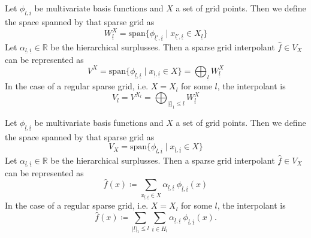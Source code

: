 \documentclass[
  a4paper,  %
  twoside,  %
  bibliography=totoc,
  headsepline,
  cleardoublepage=empty,
  parskip=half,
  draft=false
]{scrbook}
\begin{document}
\begin{definition}
Let $\phi_{\underline{l},\underline{i}}$ be multivariate basis functions and $X$ a set of grid points.
Then we define the space spanned by that sparse grid as
\begin{equation}
W_{\underline{l}}^X=\text{span} \{\phi_{\underline{l'},\underline{i}} \mid x_{\underline{l'},\underline{i}} \in X_{\underline{l}}\}
\end{equation}
Let $\alpha_{\underline{l},\underline{i}} \in \mathds{R}$ be the hierarchical surplusses.
Then a sparse grid interpolant $\hat{f} \in V_X$ can be represented as
\begin{equation}
V^X=\text{span} \{\phi_{\underline{l},\underline{i}} \mid x_{\underline{l},\underline{i}} \in X\}=\bigoplus_{\underline{l}} W^X_{\underline{l}}
\end{equation}
In the case of a regular sparse grid, i.e. $X=X_{l}$ for some $l$, the interpolant is
\begin{equation}
V_l=V^{X_l}=\bigoplus_{|\underline{l}|_1 \leq l} W^X_{\underline{l}}
\end{equation}
\end{definition}

\begin{definition}[Interpolants]
Let $\phi_{\underline{l},\underline{i}}$ be multivariate basis functions and $X$ a set of grid points.
Then we define the space spanned by that sparse grid as
\begin{equation}
V_X=\text{span} \{\phi_{\underline{l},\underline{i}} \mid x_{\underline{l},\underline{i}} \in X\}
\end{equation}
Let $\alpha_{\underline{l},\underline{i}} \in \mathds{R}$ be the hierarchical surplusses.
Then a sparse grid interpolant $\hat{f} \in V_X$ can be represented as
\begin{equation}
\hat{f}(x) \coloneqq \sum_{x_{\underline{l},\underline{i}} \in X} \alpha_{\underline{l},\underline{i}} ~ \phi_{
\underline{l},\underline{i}}(x)
\end{equation}
In the case of a regular sparse grid, i.e. $X=X_{l}$ for some $l$, the interpolant is
\begin{equation}
\hat{f}(x) \coloneqq \sum_{|\underline{l}|_1 \leq l} \sum_{\underline{i} \in {H_{\underline{l}}}} \alpha_{\underline{l},\underline{i}} ~ \phi_{
\underline{l},\underline{i}}(x).
\end{equation}
\end{definition}
\end{document}
